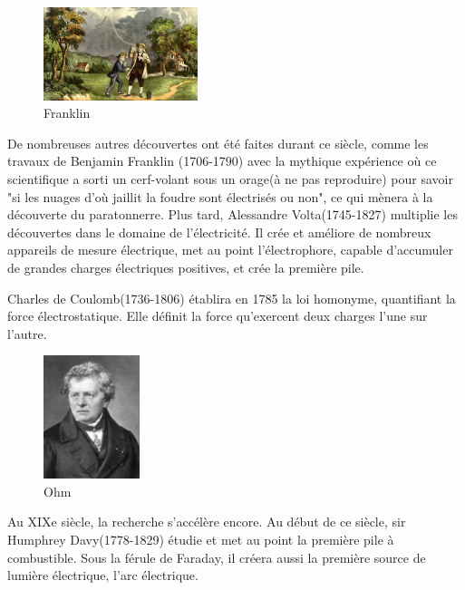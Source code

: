 \documentclass[12pt]{report}
\begin{document}
\begin{figure}
  \begin{center}
    \includegraphics[width=0.4\textwidth]{franklin}
  \end{center}
  \caption{Franklin}
\end{figure}
De nombreuses autres découvertes ont été faites durant ce siècle, comme les travaux de Benjamin Franklin (1706-1790) avec la mythique expérience où ce scientifique a sorti un cerf-volant sous un orage(à ne pas reproduire) pour savoir "si les nuages d'où jaillit la foudre sont électrisés ou non", ce qui mènera à la découverte du paratonnerre. Plus tard, Alessandre Volta(1745-1827) multiplie les découvertes dans le domaine de l'électricité. Il crée et améliore de nombreux appareils de mesure électrique, met au point l'électrophore, capable d'accumuler de grandes charges électriques positives, et crée la première pile.

Charles de Coulomb(1736-1806) établira en 1785 la loi homonyme, quantifiant la force électrostatique. Elle définit la force qu'exercent deux charges l'une sur l'autre.
\begin{figure}
  \begin{center}
    \includegraphics[width=0.25\textwidth]{ohm}
  \end{center}
  \caption{Ohm}
\end{figure}

Au XIXe siècle, la recherche s'accélère encore. Au début de ce siècle, sir Humphrey Davy(1778-1829) étudie et met au point la première pile à combustible. Sous la férule de Faraday, il créera aussi la première source de lumière électrique, l'arc électrique.
\end{document}
